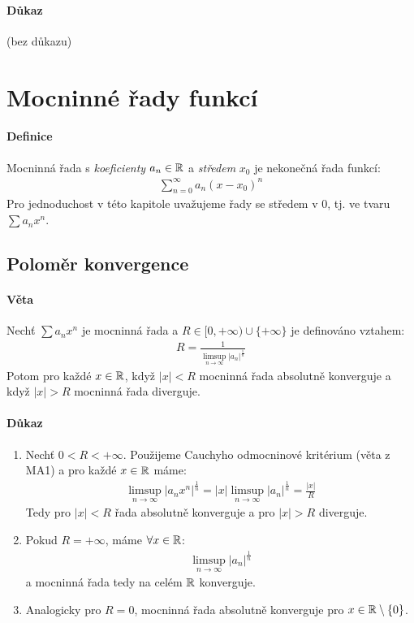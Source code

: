 \documentclass[a4paper,10pt]{article}
\begin{document}
\paragraph{Důkaz}
(bez důkazu)



\section{Mocninné řady funkcí}
\setcounter{equation}{0}
\paragraph{Definice}
Mocninná řada s \emph{koeficienty} $a_n \in \mathbb{R}$ a \emph{středem} $x_0$ je nekonečná řada funkcí:
\begin{align*}
	\sum_{n = 0}^\infty  a_n (x - x_0)^n
\end{align*}
Pro jednoduchost v této kapitole uvažujeme řady se středem v 0, tj. ve tvaru $\sum a_n x^n$.


\subsection{Poloměr konvergence}
\label{polomer-konvergence}
\setcounter{equation}{0}
\paragraph{Věta}
Nechť $\sum a_n x^n$ je mocninná řada a $R \in [0, +\infty) \cup \{+\infty\}$ je
definováno vztahem:
\begin{align*}
	R = \frac{1}{\limsup_{n \to \infty} |a_n|^{\frac{1}{n}}}
\end{align*}
Potom pro každé $x \in \mathbb{R}$, když $|x| < R$ mocninná řada absolutně konverguje a
když $|x| > R$ mocninná řada diverguje.
\paragraph{Důkaz}
\begin{enumerate}
	\item Nechť $0 < R < +\infty$. Použijeme Cauchyho odmocninové kritérium
	(věta z MA1) a pro každé $x \in \mathbb{R}$ máme:
	\begin{align}
		\limsup_{n \to \infty} |a_n x^n|^{\frac{1}{n}} = |x|
		\limsup_{n\to\infty} |a_n|^{\frac{1}{n}} = \frac{|x|}{R}
	\end{align}
	Tedy pro $|x| < R$ řada absolutně konverguje a pro $|x| > R$ diverguje.
	\item Pokud $R = +\infty$, máme $\forall x \in \mathbb{R}$:
	\begin{align}
		\limsup_{n \to \infty} |a_n|^{\frac{1}{n}}
	\end{align}
	a mocninná řada tedy na celém $\mathbb{R}$ konverguje.
	\item Analogicky pro $R = 0$, mocninná řada absolutně konverguje pro $x \in
	\mathbb{R} \setminus \{0\}$.
\end{enumerate}
\end{document}
